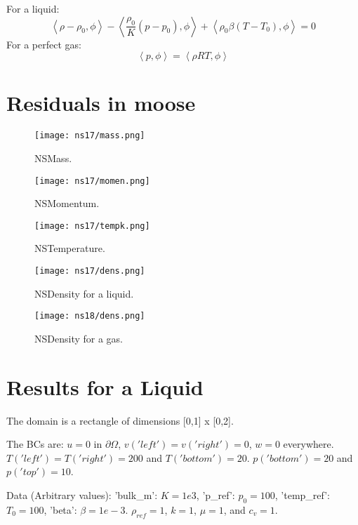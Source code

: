 \documentclass[11pt,letterpaper]{article}
\begin{document}
\noindent
For a liquid:
\begin{equation}
\left< \rho - \rho_{0}, \phi \right> - \left< \frac{\rho_{0}}{K}(p-p_{0}), \phi \right> + \left< \rho_{0}\beta(T-T_{0}), \phi \right> = 0
\end{equation}
\noindent
For a perfect gas:
\begin{equation}
\left< p, \phi \right> = \left< \rho R T, \phi \right>
\end{equation}

\section{Residuals in moose}
\begin{figure}[H]
	\centering
	\texttt{[image: ns17/mass.png]}
	\hfill
	\caption{NSMass.}
	\label{fig:mass}
\end{figure}

\begin{figure}[H]
	\centering
	\texttt{[image: ns17/momen.png]}
	\hfill
	\caption{NSMomentum.}
	\label{fig:momen}
\end{figure}

\begin{figure}[H]
	\centering
	\texttt{[image: ns17/tempk.png]}
	\hfill
	\caption{NSTemperature.}
	\label{fig:temp}
\end{figure}

\begin{figure}[H]
	\centering
	\texttt{[image: ns17/dens.png]}
	\hfill
	\caption{NSDensity for a liquid.}
	\label{fig:densl}
\end{figure}

\begin{figure}[H]
	\centering
	\texttt{[image: ns18/dens.png]}
	\hfill
	\caption{NSDensity for a gas.}
	\label{fig:densg}
\end{figure}

\section{Results for a Liquid}
The domain is a rectangle of dimensions [0,1] x [0,2].

The BCs are:
$u = 0$ in $\partial \Omega$, $v('left') = v('right') = 0$, $w = 0$ everywhere.
$T('left')=T('right')=200$ and $T('bottom')=20$.
$p('bottom')=20$ and $p('top')=10$.

\noindent
Data (Arbitrary values):
'bulk\_m': $K = 1e3$, 'p\_ref': $p_{0} = 100$, 'temp\_ref': $T_{0} = 100$, 'beta': $\beta = 1e-3$.
$\rho_{ref} = 1$, $k = 1$, $\mu = 1$, and $c_{v}=1$.
\end{document}
